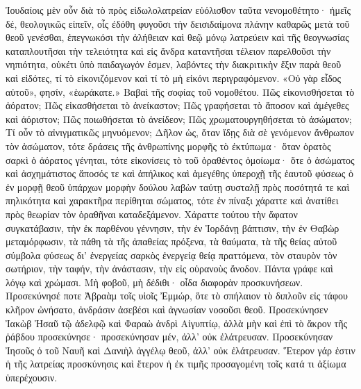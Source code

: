 \documentclass[10pt]{book}
\newcommand{\switchenglish}{\selectlanguage{english} \switchcolumn}
\begin{document}
\begin{paracol}{2}
Ἰουδαίοις μὲν οὖν διὰ τὸ πρὸς εἰδωλολατρείαν εὐόλισθον ταῦτα νενομοθέτητο· ἡμεῖς δέ, θεολογικῶς εἰπεῖν, οἷς ἐδόθη φυγοῦσι τὴν δεισιδαίμονα πλάνην καθαρῶς μετὰ τοῦ θεοῦ γενέσθαι, ἐπεγνωκόσι τὴν ἀλήθειαν καὶ θεῷ μόνῳ λατρεύειν καὶ τῆς θεογνωσίας καταπλουτῆσαι τὴν τελειότητα καὶ εἰς ἄνδρα καταντῆσαι τέλειον παρελθοῦσι τὴν νηπιότητα, οὐκέτι ὑπὸ παιδαγωγόν ἐσμεν, λαβόντες τὴν διακριτικὴν ἕξιν παρὰ θεοῦ καὶ εἰδότες, τί τὸ εἰκονιζόμενον καὶ τί τὸ μὴ εἰκόνι περιγραφόμενον.
«Οὐ γὰρ εἶδος αὐτοῦ», φησίν, «ἑωράκατε.» Βαβαὶ τῆς σοφίας τοῦ νομοθέτου.
Πῶς εἰκονισθήσεται τὸ ἀόρατον; Πῶς εἰκασθήσεται τὸ ἀνείκαστον; Πῶς γραφήσεται τὸ ἄποσον καὶ ἀμέγεθες καὶ ἀόριστον; Πῶς ποιωθήσεται τὸ ἀνείδεον; Πῶς χρωματουργηθήσεται τὸ ἀσώματον; Τί οὖν τὸ αἰνιγματικῶς μηνυόμενον; Δῆλον ὡς, ὅταν ἴδῃς διὰ σὲ γενόμενον ἄνθρωπον τὸν ἀσώματον, τότε δράσεις τῆς ἀνθρωπίνης μορφῆς τὸ ἐκτύπωμα· ὅταν ὁρατὸς σαρκὶ ὁ ἀόρατος γένηται, τότε εἰκονίσεις τὸ τοῦ ὁραθέντος ὁμοίωμα· ὅτε ὁ ἀσώματος καὶ ἀσχημάτιστος ἄποσός τε καὶ ἀπήλικος καὶ ἀμεγέθης ὑπεροχῇ τῆς ἑαυτοῦ φύσεως ὁ ἐν μορφῇ θεοῦ ὑπάρχων μορφὴν δούλου λαβὼν ταύτῃ συσταλῇ πρὸς ποσότητά τε καὶ πηλικότητα καὶ χαρακτῆρα περίθηται σώματος, τότε ἐν πίναξι χάραττε καὶ ἀνατίθει πρὸς θεωρίαν τὸν ὁραθῆναι καταδεξάμενον.
Χάραττε τούτου τὴν ἄφατον συγκατάβασιν, τὴν ἐκ παρθένου γέννησιν, τὴν ἐν Ἰορδάνῃ βάπτισιν, τὴν ἐν Θαβὼρ μεταμόρφωσιν, τὰ πάθη τὰ τῆς ἀπαθείας πρόξενα, τὰ θαύματα, τὰ τῆς θείας αὐτοῦ σύμβολα φύσεως δι’ ἐνεργείας σαρκὸς ἐνεργείᾳ θείᾳ πραττόμενα, τὸν σταυρὸν τὸν σωτήριον, τὴν ταφήν, τὴν ἀνάστασιν, τὴν εἰς οὐρανοὺς ἄνοδον.
Πάντα γράφε καὶ λόγῳ καὶ χρώμασι.
Μὴ φοβοῦ, μὴ δέδιθι· οἶδα διαφορὰν προσκυνήσεων.
Προσεκύνησέ ποτε Ἀβραὰμ τοῖς υἱοῖς Ἐμμώρ, ὅτε τὸ σπήλαιον τὸ διπλοῦν εἰς τάφου κλῆρον ὠνήσατο, ἀνδράσιν ἀσεβέσι καὶ ἀγνωσίαν νοσοῦσι θεοῦ.
Προσεκύνησεν Ἰακὼβ Ἠσαῦ τῷ ἀδελφῷ καὶ Φαραὼ ἀνδρὶ Αἰγυπτίῳ, ἀλλὰ μὴν καὶ ἐπὶ τὸ ἄκρον τῆς ῥάβδου προσεκύνησε· προσεκύνησαν μέν, ἀλλ’ οὐκ ἐλάτρευσαν.
Προσεκύνησαν Ἰησοῦς ὁ τοῦ Ναυῆ καὶ Δανιὴλ ἀγγέλῳ θεοῦ, ἀλλ’ οὐκ ἐλάτρευσαν.
Ἕτερον γάρ ἐστιν ἡ τῆς λατρείας προσκύνησις καὶ ἕτερον ἡ ἐκ τιμῆς προσαγομένη τοῖς κατά τι ἀξίωμα ὑπερέχουσιν.

\switchenglish


\end{paracol}
\end{document}

